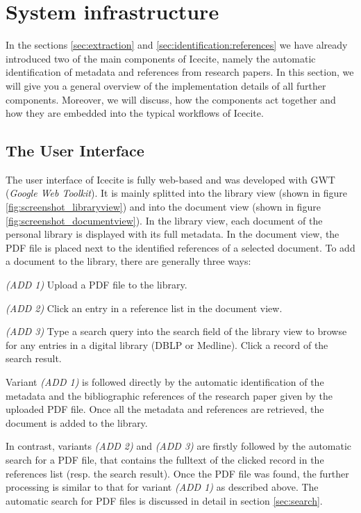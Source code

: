 \section{System infrastructure}
In the sections \ref{sec:extraction} and \ref{sec:identification:references} we have already introduced two of the main components of Icecite, namely the automatic identification of metadata and references from research papers. In this section, we will give you a general overview of the implementation details of all further components. Moreover, we will discuss, how the components act together and how they are embedded into the typical workflows of Icecite.

\subsection{The User Interface}
The user interface of Icecite is fully web-based and was developed with GWT (\textit{Google Web Toolkit}). It is mainly splitted into the library view (shown in figure \ref{fig:screenshot_libraryview}) and into the document view (shown in figure \ref{fig:screenshot_documentview}). In the library view, each document of the personal library is displayed with its full metadata. In the document view, the PDF file is placed next to the identified references of a selected document. To add a document to the library, there are generally three ways:

\par\medskip\noindent
\textit{(ADD 1)} Upload a PDF file to the library.
\par\medskip\noindent
\textit{(ADD 2)} Click an entry in a reference list in the document view.
\par\medskip\noindent
\textit{(ADD 3)} Type a search query into the search field of the library view to browse for any entries in a digital library (DBLP or Medline). Click a record of the search result.
\medskip

Variant \textit{(ADD 1)} is followed directly by the automatic identification of the metadata and the bibliographic references of the research paper given by the uploaded PDF file. Once all the metadata and references are retrieved, the document is added to the library.

In contrast, variants \textit{(ADD 2)} and \textit{(ADD 3)} are firstly followed by the automatic search for a PDF file, that contains the fulltext of the clicked record in the references list (resp. the search result). Once the PDF file was found, the further processing is similar to that for variant \textit{(ADD 1)} as described above. The automatic search for PDF files is discussed in detail in section \ref{sec:search}.

